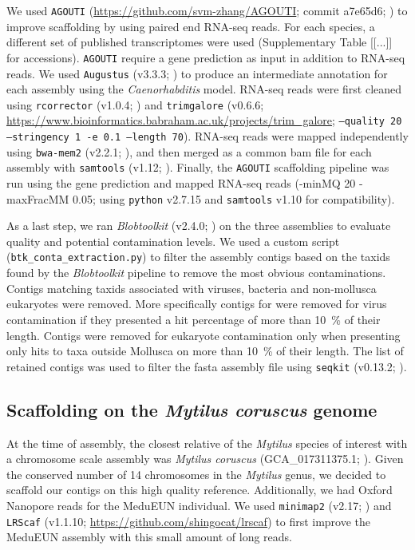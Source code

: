 \documentclass[11pt, a4paper]{article}
\begin{document}
We used \texttt{AGOUTI} (\url{https://github.com/svm-zhang/AGOUTI}; commit a7e65d6; \cite{Zhang2016a}) to improve scaffolding by using paired end RNA-seq reads.
For each species, a different set of published transcriptomes were used (Supplementary Table [[...]] for accessions).
\texttt{AGOUTI} require a gene prediction as input in addition to RNA-seq reads.
We used \texttt{Augustus} (v3.3.3; \cite{Stanke2008}) to produce an intermediate annotation for each assembly using the \textit{Caenorhabditis} model.
RNA-seq reads were first cleaned using \texttt{rcorrector} (v1.0.4; \cite{Song2015}) and \texttt{trimgalore} (v0.6.6; \url{https://www.bioinformatics.babraham.ac.uk/projects/trim_galore}; \texttt{--quality 20 --stringency 1 -e 0.1 --length 70}).
RNA-seq reads were mapped independently using \texttt{bwa-mem2} (v2.2.1; \cite{VasimuddinMd2019}), and then merged as a common bam file for each assembly with \texttt{samtools} (v1.12; \cite{Li2009}).
Finally, the \texttt{AGOUTI} scaffolding pipeline was run using the gene prediction and mapped RNA-seq reads (-minMQ 20 -maxFracMM 0.05; using \texttt{python} v2.7.15 and \texttt{samtools} v1.10 for compatibility).

As a last step, we ran \textit{Blobtoolkit} (v2.4.0; \cite{Challis2020}) on the three assemblies to evaluate quality and potential contamination levels.
We used a custom script (\texttt{btk\_conta\_extraction.py}) to filter the assembly contigs based on the taxids found by the \textit{Blobtoolkit} pipeline to remove the most obvious contaminations.
Contigs matching taxids associated with viruses, bacteria and non-mollusca eukaryotes were removed.
More specifically contigs for were removed for virus contamination if they presented a hit percentage of more than 10~\% of their length.
Contigs were removed for eukaryote contamination only when presenting only hits to taxa outside Mollusca on more than 10~\% of their length.
The list of retained contigs was used to filter the fasta assembly file using \texttt{seqkit} (v0.13.2; \cite{Shen2016}).


\subsection{Scaffolding on the \textit{Mytilus coruscus} genome}

At the time of assembly, the closest relative of the \textit{Mytilus} species of interest with a chromosome scale assembly was \textit{Mytilus coruscus} (GCA\_017311375.1; \cite{Yang2021}).
Given the conserved number of 14 chromosomes in the \textit{Mytilus} genus, we decided to scaffold our contigs on this high quality reference.
Additionally, we had Oxford Nanopore reads for the MeduEUN individual. 
We used \texttt{minimap2} (v2.17; \cite{Li2017}) and \texttt{LRScaf} (v1.1.10; \url{https://github.com/shingocat/lrscaf}) to first improve the MeduEUN assembly with this small amount of long reads.
\end{document}
